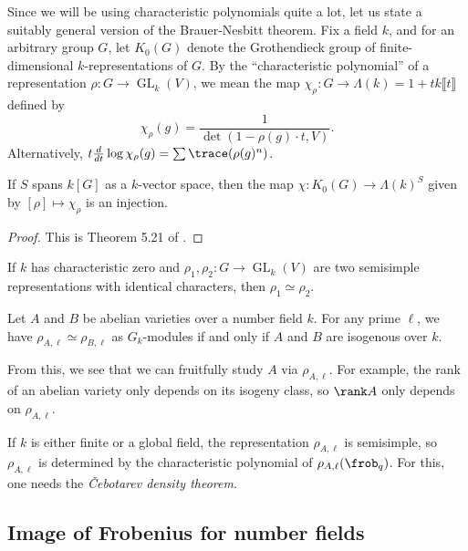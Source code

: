 Since we will be using characteristic polynomials quite a lot, let us state a 
suitably general version of the Brauer-Nesbitt theorem. Fix a field $k$, and 
for an arbitrary group $G$, let $K_0(G)$ denote the Grothendieck group of 
finite-dimensional $k$-representations of $G$. By the ``characteristic 
polynomial'' of a representation $\rho:G \to \operatorname{GL}_k(V)$, we mean 
the map $\chi_\rho:G\to \Lambda(k)=1+t k\llbracket t\rrbracket$ defined by 
\[
  \chi_\rho(g) = \frac{1}{\det(1-\rho(g)\cdot t, V)} \text{.}
\]
Alternatively, $t\frac{d}{dt} \log \chi_\rho(g) = \sum \trace(\rho(g)^n)$. 

\begin{theorem}
If $S$ spans $k[G]$ as a $k$-vector space, then the map 
$\chi:K_0(G) \to \Lambda(k)^S$ given by $[\rho]\mapsto \chi_\rho$ is an 
injection. 
\end{theorem}
\begin{proof}
This is Theorem 5.21 of \cite{eg11}. 
\end{proof}

\begin{corollary}
If $k$ has characteristic zero and 
$\rho_1,\rho_2:G \to \operatorname{GL}_k(V)$ are two semisimple representations 
with identical characters, then $\rho_1\simeq \rho_2$. 
\end{corollary}







\begin{theorem}
Let $A$ and $B$ be abelian varieties over a number field $k$. For any prime 
$\ell$, we have $\rho_{A,\ell}\simeq \rho_{B,\ell}$ as $G_k$-modules if and 
only if $A$ and $B$ are isogenous over $k$. 
\end{theorem}

From this, we see that we can fruitfully study $A$ via $\rho_{A,\ell}$. For 
example, the rank of an abelian variety only depends on its isogeny class, so 
$\rank A$ only depends on $\rho_{A,\ell}$. 

If $k$ is either finite or a global field, the representation $\rho_{A,\ell}$ 
is semisimple, so $\rho_{A,\ell}$ is determined by the characteristic 
polynomial of $\rho_{A,\ell}(\frob_q)$. For this, one needs the 
\emph{\v Cebotarev density theorem}. 





\subsection{Image of Frobenius for number fields}

